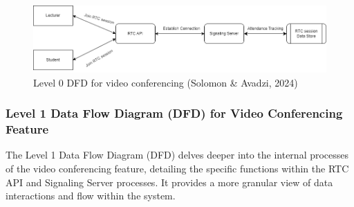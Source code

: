 \documentclass[a4paper,12pt]{article}  %
\begin{document}
\begin{figure}[H]
      \centering
      \includegraphics[width=1\textwidth]{figures/data-flow-level-0.drawio.png}
      \caption{Level 0 DFD for video conferencing (Solomon \& Avadzi, 2024)}
\end{figure}

\subsubsection{Level 1 Data Flow Diagram (DFD) for Video Conferencing Feature}
The Level 1 Data Flow Diagram (DFD) delves deeper into the internal processes
of the video conferencing feature, detailing the specific functions within the
RTC API and Signaling Server processes. It provides a more granular view of
data interactions and flow within the system.\\
\end{document}
